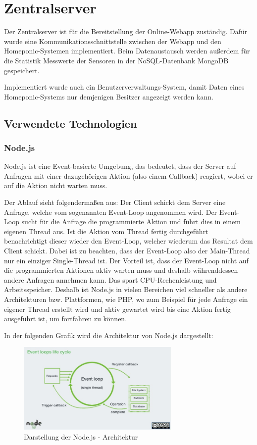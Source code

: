 \newpage
\blankpage
\blankpage
\blankpage
\section{Zentralserver}
\setcounter{page}{127}
Der Zentralserver ist für die Bereitstellung der Online-Webapp zuständig. Dafür wurde eine Kommunikationsschnittstelle zwischen der Webapp und den Homeponic-Systemen implementiert. Beim Datenaustausch werden außerdem für die Statistik Messwerte der Sensoren in der NoSQL-Datenbank MongoDB gespeichert. 

Implementiert wurde auch ein Benutzerverwaltungs-System, damit Daten eines Homeponic-Systems nur demjenigen Besitzer angezeigt werden kann.

\subsection{Verwendete Technologien}
\subsubsection{Node.js}
Node.js ist eine Event-basierte Umgebung, das bedeutet, dass der Server auf Anfragen mit einer dazugehörigen Aktion (also einem Callback) reagiert, wobei er auf die Aktion nicht warten muss.

Der Ablauf sieht folgendermaßen aus: Der Client schickt dem Server eine Anfrage, welche vom sogenannten Event-Loop  angenommen wird. Der Event-Loop sucht für die Anfrage die programmierte Aktion und führt dies in einem eigenen Thread aus. Ist die Aktion vom Thread fertig durchgeführt benachrichtigt dieser wieder den Event-Loop, welcher wiederum das Resultat dem Client schickt. Dabei ist zu beachten, dass der Event-Loop also der Main-Thread nur ein einziger Single-Thread ist. Der Vorteil ist, dass der Event-Loop nicht auf die programmierten Aktionen aktiv warten muss und deshalb währenddessen andere Anfragen annehmen kann. Das spart CPU-Rechenleistung und Arbeitsspeicher. Deshalb ist Node.js in vielen Bereichen viel schneller als andere Architekturen bzw. Plattformen, wie PHP, wo zum Beispiel für jede Anfrage ein eigener Thread erstellt wird und aktiv gewartet wird bis eine Aktion fertig ausgeführt ist, um fortfahren zu können.

In der folgenden Grafik wird die Architektur von Node.js dargestellt:

\begin{figure}[ht]
    \centering
	\includegraphics[width=0.7\textwidth]{images/nodejs}
	\caption{Darstellung der Node.js - Architektur \cite{node}}
\end{figure}

